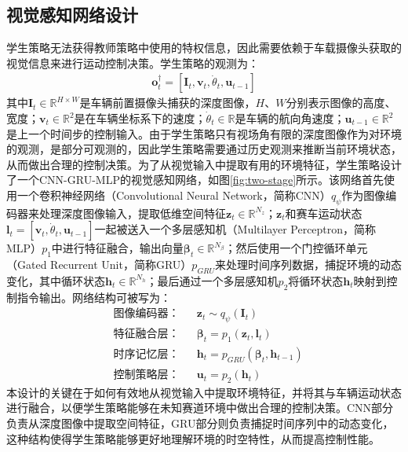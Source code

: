 \subsection{视觉感知网络设计}
学生策略无法获得教师策略中使用的特权信息，因此需要依赖于车载摄像头获取的视觉信息来进行运动控制决策。学生策略的观测为：
\begin{equation}
\begin{aligned}
\boldsymbol{o}^\dagger_t=[\boldsymbol{I}_t, \boldsymbol{v}_t, \dot{\theta}_t, \boldsymbol{u}_{t-1}]
\end{aligned}
\label{equ:student-observation}
\end{equation}其中$\boldsymbol{I}_t\in\mathbb{R}^{H\times W}$是车辆前置摄像头捕获的深度图像，$H$、$W$分别表示图像的高度、宽度；$\boldsymbol{v}_t\in\mathbb{R}^2$是在车辆坐标系下的速度；$\dot{\theta}_t\in\mathbb{R}$是车辆的航向角速度；$\boldsymbol{u}_{t-1}\in\mathbb{R}^2$是上一个时间步的控制输入。由于学生策略只有视场角有限的深度图像作为对环境的观测，是部分可观测的，因此学生策略需要通过历史观测来推断当前环境状态，从而做出合理的控制决策。为了从视觉输入中提取有用的环境特征，学生策略设计了一个CNN-GRU-MLP的视觉感知网络，如图\ref{fig:two-stage}所示。该网络首先使用一个卷积神经网络（Convolutional Neural Network，简称CNN）$q_\psi$作为图像编码器来处理深度图像输入，提取低维空间特征$\boldsymbol{z}_t\in\mathbb{R}^{N_z}$；$\boldsymbol{z}_t$和赛车运动状态$\boldsymbol{l}_t=[\boldsymbol{v}_t, \dot{\theta}_t, \boldsymbol{u}_{t-1}]$一起被送入一个多层感知机（Multilayer Perceptron，简称MLP）$p_1$中进行特征融合，输出向量$\boldsymbol{\beta}_t\in\mathbb{R}^{N_\beta}$；然后使用一个门控循环单元（Gated Recurrent Unit，简称GRU）\cite{chung2014empirical}$p_{GRU}$来处理时间序列数据，捕捉环境的动态变化，其中循环状态$\boldsymbol{h}_t\in\mathbb{R}^{N_h}$；最后通过一个多层感知机$p_2$将循环状态$\boldsymbol{h}_t$映射到控制指令输出。网络结构可被写为：
\begin{equation}
\begin{aligned}
    &\text{图像编码器：} & & \boldsymbol{z}_t\sim q_{\psi}(\boldsymbol{I}_t)\\
    &\text{特征融合层：} & & \boldsymbol{\beta}_t=p_1(\boldsymbol{z}_t,\boldsymbol{l}_t)\\
    &\text{时序记忆层：} & & \boldsymbol{h}_{t}=p_{GRU}(\boldsymbol{\beta}_t,\boldsymbol{h}_{t-1})\\
    &\text{控制策略层：} & &\boldsymbol{u}_t=p_2(\boldsymbol{h}_t)
\end{aligned}
\label{equ:student-net}
\end{equation}
本设计的关键在于如何有效地从视觉输入中提取环境特征，并将其与车辆运动状态进行融合，以便学生策略能够在未知赛道环境中做出合理的控制决策。CNN部分负责从深度图像中提取空间特征，GRU部分则负责捕捉时间序列中的动态变化，这种结构使得学生策略能够更好地理解环境的时空特性，从而提高控制性能。

